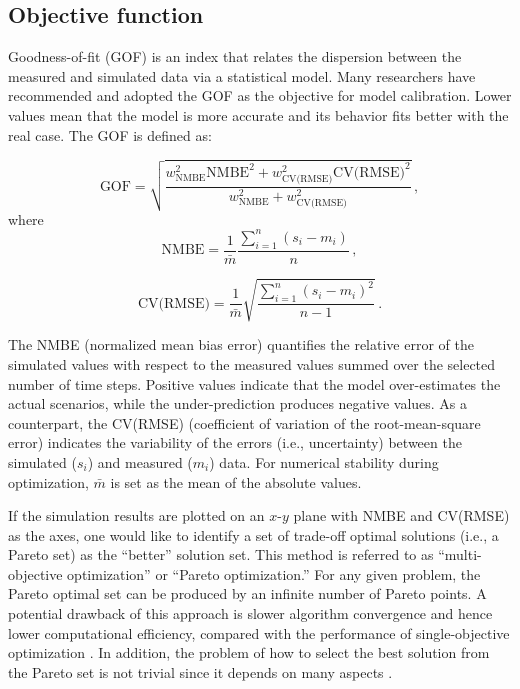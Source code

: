 \subsection{Objective function}

Goodness-of-fit (GOF) is an index that relates the dispersion between the measured and simulated data via a statistical model. Many researchers \cite{ruiz2017analysis,reddy2007calibrating} have recommended and adopted the GOF as the objective for model calibration. Lower values mean that the model is more accurate and its behavior fits better with the real case. The GOF is defined as:

\begin{equation}
\textrm{GOF} = \sqrt{\frac{w^2_{\textrm{NMBE}} \textrm{NMBE}^2 + w^2_{\textrm{CV(RMSE)}} \textrm{CV(RMSE)}^2}{w^2_{\textrm{NMBE}} + w^2_{\textrm{CV(RMSE)}}}}\,,
\end{equation}
\vspace{12pt}
\noindent where
\vspace{0em}
\begin{equation}
\textrm{NMBE} = \frac{1}{\bar{m}} \frac{\sum_{i=1}^n (s_i - m_i)}{n}\,,
\end{equation}

\begin{equation}
\textrm{CV(RMSE)} = \frac{1}{\bar{m}} \sqrt{\frac{\sum_{i=1}^n (s_i - m_i)^2}{n-1}}\,.
\end{equation}

\vspace{15pt}
The NMBE (normalized mean bias error) quantifies the relative error of the simulated values with respect to the measured values summed over the selected number of time steps. Positive values indicate that the model over-estimates the actual scenarios, while the under-prediction produces negative values. As a counterpart, the CV(RMSE) (coefficient of variation of the root-mean-square error) indicates the variability of the errors (i.e., uncertainty) between the simulated ($s_i$) and measured ($m_i$) data. For numerical stability during optimization, $\bar{m}$ is set as the mean of the absolute values.

If the simulation results are plotted on an $x$-$y$ plane with NMBE and CV(RMSE) as the axes, one would like to identify a set of trade-off optimal solutions (i.e., a Pareto set) as the ``better'' solution set. This method is referred to as ``multi-objective optimization'' or ``Pareto optimization.'' For any given problem, the Pareto optimal set can be produced by an infinite number of Pareto points. A potential drawback of this approach is slower algorithm convergence and hence lower computational efficiency, compared with the performance of single-objective optimization \cite{ruiz2017analysis}. In addition, the problem of how to select the best solution from the Pareto set is not trivial since it depends on many aspects \cite{nguyen2014review}.

